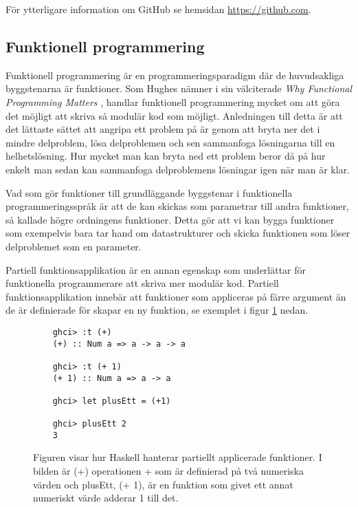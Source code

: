 \documentclass[]{article}
\begin{document}
För ytterligare information om GitHub se hemsidan \url{https://github.com}.

\subsection{Funktionell programmering}
Funktionell programmering är en programmeringsparadigm där de
huvudsakliga byggstenarna är funktioner. Som Hughes nämner i sin
välciterade \textit{Why Functional Programming Matters}
\cite{hughes1989functional}, handlar funktionell programmering mycket
om att göra det möjligt att skriva så modulär kod som möjligt.
Anledningen till detta är att det lättaste sättet att angripa ett
problem på är genom att bryta ner det i mindre delproblem, lösa
delproblemen och sen sammanfoga lösningarna till en helhetslösning.
Hur mycket man kan bryta ned ett problem beror då på hur enkelt man
sedan kan sammanfoga delproblemens lösningar igen när man är klar.

Vad som gör funktioner till grundläggande byggstenar i funktionella
programmeringsspråk är att de kan skickas som parametrar till andra
funktioner, så kallade högre ordningens funktioner. Detta gör att vi
kan bygga funktioner som exempelvis bara tar hand om datastrukturer
och skicka funktionen som löser delproblemet som en parameter.

Partiell funktionsapplikation är en annan egenskap som underlättar för
funktionella programmerare att skriva mer modulär kod.  Partiell
funktionsapplikation innebär att funktioner som appliceras på färre
argument än de är definierade för skapar en ny funktion, se exemplet i
figur \ref{hask:partfunapp} nedan.

\begin{figure}
  \begin{verbatim}
    ghci> :t (+)
    (+) :: Num a => a -> a -> a

    ghci> :t (+ 1)
    (+ 1) :: Num a => a -> a

    ghci> let plusEtt = (+1)

    ghci> plusEtt 2
    3
  \end{verbatim}
  \caption{Figuren visar hur Haskell hanterar partiellt applicerade
    funktioner.  I bilden är (+) operationen + som är definierad på
    två numeriska värden och plusEtt, (+ 1), är en funktion som givet
    ett annat numeriskt värde adderar 1 till det.}
  \label{hask:partfunapp}
\end{figure}
\end{document}
